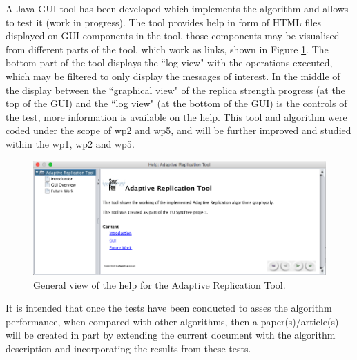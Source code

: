 \documentclass[12pt,twoside]{article}
\begin{document}
A Java GUI tool has been developed which implements the algorithm and allows to test it (work in progress). The tool provides help in form of HTML files displayed on GUI components in the tool, those components may be visualised from different parts of the tool, which work as links, shown in Figure \ref{fig:tool_help}. The bottom part of the tool displays the ``log view" with the operations executed, which may be filtered to only display the messages of interest. In the middle of the display between the ``graphical view" of the replica strength progress (at the top of the GUI) and the ``log view" (at the bottom of the GUI) is the controls of the test, more information is available on the help. This tool and algorithm were coded under the scope of  \gls{wp2} and \gls{wp5}, and will be further improved and studied within the \gls{wp1}, \gls{wp2} and \gls{wp5}.
\begin{figure}[ht!]
	\centering
	\includegraphics[width=1\textwidth]{figures/toolHelp.png}
	
	\caption{General view of the help for the Adaptive Replication Tool.}
	\label{fig:tool_help}
\end{figure}

It is intended that once the tests have been conducted to asses the algorithm performance, when compared with other algorithms, then a paper(s)/article(s) will be created in part by extending the current document with the algorithm description and incorporating the results from these tests.


\newpage


\printglossaries

\appendix
%	
%
%
\end{document}
